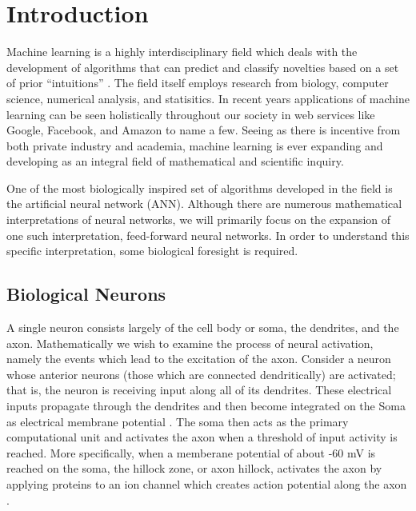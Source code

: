 \documentclass{ib-assignment}
\begin{document}
\newpage
\tableofcontents
\newpage
\section{Introduction}
Machine learning is a highly interdisciplinary field which deals with the development of algorithms that can predict and classify novelties based on a set of prior “intuitions” \cite{mlsurvey}. The field itself employs research from biology, computer science, numerical analysis, and statisitics. In recent years applications of machine learning can be seen holistically throughout our society in web services like Google, Facebook, and Amazon to name a few. Seeing as there is incentive from both private industry and academia, machine learning is ever expanding and developing as an integral field of mathematical and scientific inquiry.  


One of the most biologically inspired set of algorithms developed in the field is the artificial neural network (ANN). Although there are numerous mathematical interpretations of neural networks, we will primarily focus on the expansion of one such interpretation, feed-forward neural networks. In order to understand this specific interpretation, some biological foresight is required.
\subsection{Biological Neurons}
A single neuron consists largely of the cell body or soma, the dendrites, and the axon. Mathematically we wish to examine the process of neural activation, namely the events which lead to the excitation of the axon. Consider a neuron whose anterior neurons (those which are connected dendritically) are activated; that is, the neuron is receiving input along all of its dendrites. These electrical inputs propagate through the dendrites and then become integrated on the Soma as electrical membrane potential \cite{griffith}. The soma then acts as the primary computational unit and activates the axon when a threshold of input activity is reached. More specifically, when a memberane potential of about -60 mV is reached on the soma, the hillock zone, or axon hillock, activates the axon by applying proteins to an ion channel which creates action potential along the axon \cite{bioneuron}.
\end{document}
